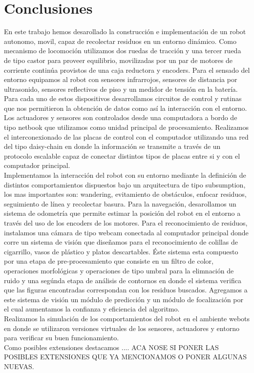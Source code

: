 
\section{Conclusiones}
En este trabajo hemos desarollado la construcci\'on e implementaci\'on
de un robot autonomo, movil, capaz de recolectar residuos en un entorno din\'amico. 
Como mecanismo de locomoci\'on utilizamos dos ruedas de tracci\'on y una 
tercer rueda de tipo castor para proveer equilibrio, movilizadas por un 
par de motores de corriente contin\'ua provistos de una caja reductora y encoders. 
Para el sensado del entorno equipamos al robot con sensores 
infrarrojos, sensores de distancia por ultrasonido, sensores reflectivos 
de piso y un medidor de tensi\'on en la bater\'ia. Para cada uno de estos 
dispositivos desarrollamos circuitos de control y rutinas que nos permitieron 
la obtenci\'on de datos como as\'i la interacci\'on con el entorno. 
Los actuadores y sensores son controlados desde una computadora a bordo de tipo
netbook que utilizamos como unidad principal de procesamiento. 
Realizamos el interconexionado de las placas de control con el computador
utilizando una red del tipo daisy-chain en donde la informaci\'on se transmite 
a trav\'es de un protocolo escalable capaz de conectar distintos tipos de 
placas entre si y con el computador principal.\\
\indent  Implementamos la interacci\'on del 
robot con su entorno mediante la definici\'on de distintos comportamientos dispuestos 
bajo un arquitectura de tipo subsumption, los mas importantes son: 
wandering, evitamiento de obst\'aculos, enfocar residuos, seguimiento de 
l\'inea y recolectar basura. Para la navegaci\'on, desarollamos
un sistema de odometr\'ia que permite estimar la posici\'on del robot en 
el entorno a trav\'es del uso de los encoders de los motores.
Para el reconocimiento de residuos, instalamos una c\'amara de tipo webcam 
conectada al computador principal donde corre un sistema de visi\'on que 
diseñamos para el reconocimiento de colillas de cigarrillo, vasos de pl\'astico 
y platos descartables. \'Este sistema esta compuesto por una etapa de 
pre-procesamiento que consiste en un filtro de color, operaciones morfol\'ogicas 
y operaciones de tipo umbral para la elimnaci\'on de ruido y una seg\'unda 
etapa de an\'alisis de contornos en donde el sistema verifica que las figuras encontradas 
correspondan con los residuos buscados. Agregamos a este sistema de 
visi\'on un m\'odulo de predicci\'on y un m\'odulo de focalizaci\'on por 
el cual  aumentamos la confianza y eficiencia del algoritmo. \\ 
\indent Realizamos la simulaci\'on de los comportamientos del robot en el 
ambiente webots en  
donde se utilizaron versiones virtuales de los sensores, actuadores y entorno 
para verificar su buen funcionamiento. \\
\indent Como posibles extensiones destacamos .... 
ACA NOSE SI PONER LAS POSIBLES EXTENSIONES QUE YA MENCIONAMOS O PONER ALGUNAS NUEVAS.
\label{conc}
